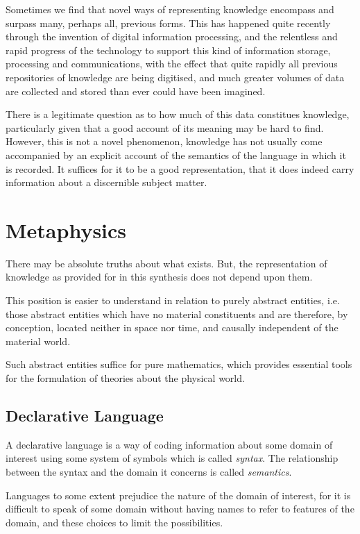 Sometimes we find that novel ways of representing knowledge encompass and surpass many, perhaps all, previous forms.
This has happened quite recently through the invention of digital information processing, and the relentless and rapid progress of the technology to support this kind of information storage, processing and communications, with the effect that quite rapidly all previous repositories of knowledge are being digitised, and much greater volumes of data are collected and stored than ever could have been imagined.

There is a legitimate question as to how much of this data constitues knowledge, particularly given that a good account of its meaning may be hard to find.
However, this is not a novel phenomenon, knowledge has not usually come accompanied by an explicit account of the semantics of the language in which it is recorded.
It suffices for it to be a good representation, that it does indeed carry information about a discernible subject matter.

\section{Metaphysics}

There may be absolute truths about what exists.
But, the representation of knowledge as provided for in this synthesis does not depend upon them.

This position is easier to understand in relation to purely abstract entities, i.e. those abstract entities which have no material constituents and are therefore, by conception, located neither in space nor time, and causally independent of the material world.

Such abstract entities suffice for pure mathematics, which provides essential tools for the formulation of theories about the physical world.

\subsection{Declarative Language}

A declarative language is a way of coding information about some domain of interest using some system of symbols which is called \emph{syntax}.
The relationship between the syntax and the domain it concerns is called \emph{semantics}.

Languages to some extent prejudice the nature of the domain of interest, for it is difficult to speak of some domain without having names to refer to features of the domain, and these choices to limit the possibilities.

